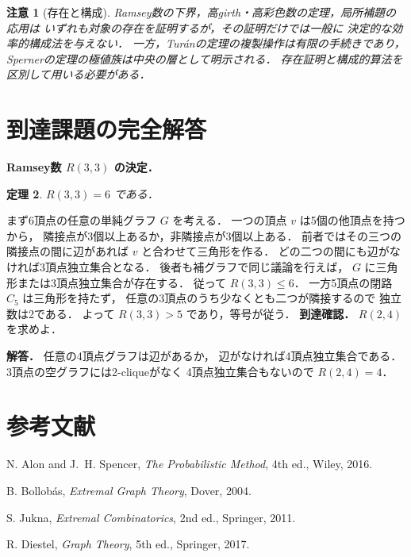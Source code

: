 \documentclass[a5paper,10pt,onecolumn]{jsarticle}
\makeatletter
\theoremstyle{mathnotetheorem}
\newtheorem{theorem}{定理}[section]
\newtheorem{remark}[theorem]{注意}
\renewcommand{\proofname}{証明}
\renewenvironment{proof}[1][\proofname]{%
  \par\pushQED{\qed}\normalfont\topsep4\p@\@plus2\p@\relax
  \trivlist\item[\hskip\labelsep\bfseries #1]\ignorespaces
}{\popQED\endtrivlist\@endpefalse}
\makeatother
\begin{document}
\begin{remark}[存在と構成]
Ramsey数の下界，高girth・高彩色数の定理，局所補題の応用は
いずれも対象の存在を証明するが，その証明だけでは一般に
決定的な効率的構成法を与えない．
一方，Tur\'anの定理の複製操作は有限の手続きであり，
Spernerの定理の極値族は中央の層として明示される．
存在証明と構成的算法を区別して用いる必要がある．
\end{remark}


\section{到達課題の完全解答}
\noindent\textbf{Ramsey数 $R(3,3)$ の決定．}
\begin{theorem}
$R(3,3)=6$ である．
\end{theorem}
\begin{proof}
まず6頂点の任意の単純グラフ $G$ を考える．
一つの頂点 $v$ は5個の他頂点を持つから，
隣接点が3個以上あるか，非隣接点が3個以上ある．
前者ではその三つの隣接点の間に辺があれば
$v$ と合わせて三角形を作る．
どの二つの間にも辺がなければ3頂点独立集合となる．
後者も補グラフで同じ議論を行えば，
$G$ に三角形または3頂点独立集合が存在する．
従って $R(3,3)\le6$．
一方5頂点の閉路 $C_5$ は三角形を持たず，
任意の3頂点のうち少なくとも二つが隣接するので
独立数は2である．
よって $R(3,3)>5$ であり，等号が従う．
\end{proof}
\noindent\textbf{到達確認．}
$R(2,4)$ を求めよ．
\par\noindent\textbf{解答．}
任意の4頂点グラフは辺があるか，
辺がなければ4頂点独立集合である．
3頂点の空グラフには2-cliqueがなく
4頂点独立集合もないので $R(2,4)=4$．
\section*{参考文献}
\begin{enumerate}[label={[\arabic*]},leftmargin=3.3zw]
\item N. Alon and J.~H. Spencer, \textit{The Probabilistic Method}, 4th ed., Wiley, 2016.
\item B. Bollob\'as, \textit{Extremal Graph Theory}, Dover, 2004.
\item S. Jukna, \textit{Extremal Combinatorics}, 2nd ed., Springer, 2011.
\item R. Diestel, \textit{Graph Theory}, 5th ed., Springer, 2017.
\end{enumerate}
\end{document}
